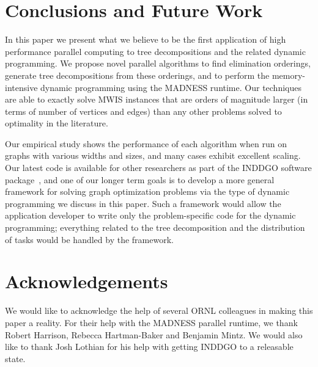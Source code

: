 \documentclass[conference]{IEEEtran}
\begin{document}
\section{Conclusions and Future Work}
In this paper we present what we believe to be the first application of high performance
 parallel computing to tree decompositions and the related dynamic programming.
We propose novel parallel
algorithms to find elimination orderings, generate tree decompositions from these orderings, and to perform
the memory-intensive dynamic programming using the MADNESS
runtime. Our techniques are able to exactly solve MWIS instances that are
orders of magnitude larger (in terms of number of vertices and edges) than any other problems solved 
to optimality in the
literature.  


Our empirical study shows the performance of each algorithm when run on graphs
with various widths and sizes, and many cases exhibit excellent scaling.
Our latest code is available for other researchers as part of the INDDGO software package~\cite{inddgo},
and one of our longer term
goals is to develop a more general framework for solving graph optimization
problems via the type of dynamic programming we discuss in this paper.
Such a framework would allow the application developer to
write only the problem-specific code for the dynamic programming; everything related
to the tree decomposition and the distribution of tasks would be handled by
the framework.

%

\section{Acknowledgements}
We would like to acknowledge the help of several ORNL colleagues in making this paper a reality. For their help with the MADNESS parallel runtime, we thank Robert Harrison, Rebecca Hartman-Baker and Benjamin Mintz. We would also like to thank Josh Lothian for his help with getting INDDGO to a releasable state.
\end{document}

